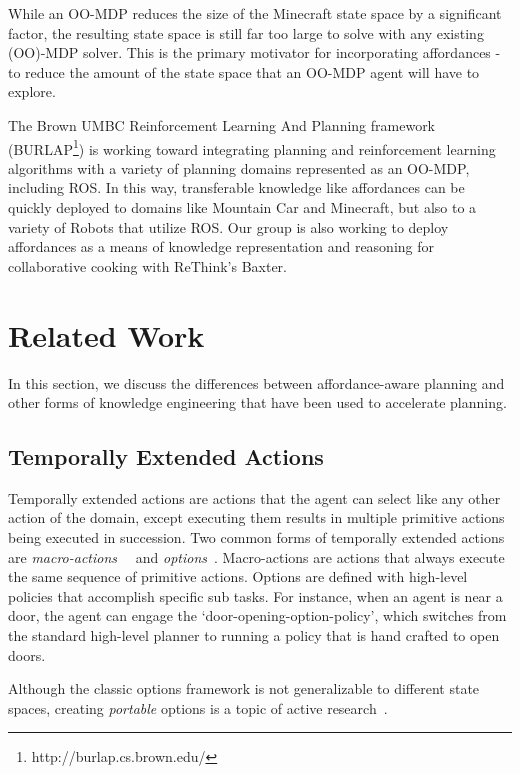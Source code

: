 \documentclass[conference]{IEEEtran}
\begin{document}
While an OO-MDP reduces the size of the Minecraft state space
by a significant factor, the resulting state space is still far too large to
solve with any existing (OO)-MDP solver. This is the primary motivator
for incorporating affordances - to reduce the amount of the
state space that an OO-MDP agent will have to explore.

The Brown UMBC Reinforcement Learning And Planning framework (BURLAP\footnote{http://burlap.cs.brown.edu/})
is working toward integrating planning and reinforcement learning algorithms with a variety of planning domains represented
as an OO-MDP, including ROS. In this way, transferable knowledge like affordances can be quickly deployed
to domains like Mountain Car \cite{Moore90efficientmemory-based} and Minecraft, but also to a variety
of Robots that utilize ROS. Our group is also working to deploy affordances as a
means of knowledge representation and reasoning for collaborative cooking with ReThink's Baxter.

\section{Related Work}
\label{sec:related-work}

In this section, we discuss the differences between
affordance-aware planning and other forms of knowledge engineering that
have been used to accelerate planning.

\subsection{Temporally Extended Actions}
Temporally extended actions are actions that the agent can
select like any other action of the domain, except executing them
results in multiple primitive actions being executed in
succession. Two common forms of temporally extended actions are {\em
  macro-actions}~\cite{hauskrecht98} ~and {\em options}~\cite{sutton99}. 
Macro-actions are actions that always
execute the same sequence of primitive actions. Options are defined
with high-level policies that accomplish specific sub tasks. For
instance, when an agent is near a door, the agent can engage the
`door-opening-option-policy', which switches from the standard
high-level planner to running a policy that is hand crafted to open
doors. 

Although the classic options framework is not generalizable to different state spaces,
creating {\em portable} options is a topic of active research~\cite{konidaris07,konidaris2009efficient,Ravindran03analgebraic,croonenborghs2008learning,andre2002state,konidaris2012transfer}.
\end{document}
